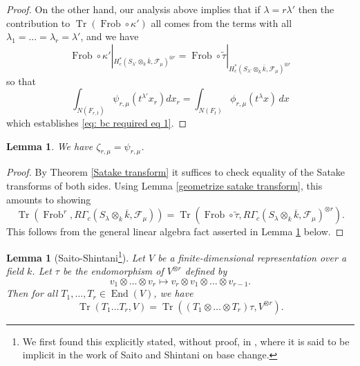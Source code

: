 \documentclass[reqno]{amsart}
\numberwithin{equation}{section}
\newcommand{\wt}[1]{\widetilde{#1}}
\newcommand{\ol}[1]{\overline{#1}}
\newcommand{\Cal}[1]{\mathcal{#1}}
\DeclareMathOperator{\Frob}{Frob}
\DeclareMathOperator{\Tr}{Tr}
\DeclareMathOperator{\End}{End}
\newtheorem{lemma}[thm]{Lemma}
\theoremstyle{remark}
\numberwithin{equation}{section}
\begin{document}
\begin{proof}
On the other hand, our analysis above implies that if $\lambda = r\lambda'$ then the contribution to $\Tr(\Frob \circ \kappa')$ all comes from the terms with all $\lambda_1 = \ldots =  \lambda_r = \lambda'$, and we have 
\[
\Frob \circ \kappa'|_{H_c^*(S_{\lambda'} \otimes_k \ol{k}, \Cal{F}_{\mu})^{\otimes r} }
= \Frob \circ \wt{\tau}|_{H_c^*(S_{\lambda'} \otimes_k \ol{k}, \Cal{F}_{\mu})^{\otimes r}}
\]
so that
\[
\int_{N(F_{r,t})} \psi_{r,\mu}(t^{\lambda'} x_r ) dx_r = \int_{N(F_t)} \phi_{r,\mu}(t^{\lambda} x) \,dx
\]
which establishes \eqref{eq: bc required eq 1}.
\end{proof}

\begin{lemma}\label{lemma2}
We have $\zeta_{r,\mu} = \psi_{r,\mu}$. 
\end{lemma}

\begin{proof} By Theorem \ref{Satake transform} it suffices to check equality of the Satake transforms of both sides. Using Lemma \ref{geometrize satake transform}, this amounts to showing
\[
\Tr(\Frob^r, R \Gamma_c(S_{\lambda} \otimes_k \ol{k}, \Cal{F}_{\mu})) = \Tr(\Frob \circ \wt{\tau}, R\Gamma_c(S_{\lambda} \otimes_k \ol{k}, \Cal{F}_{\mu})^{\otimes r}).
\]
This follows from the general linear algebra fact asserted in Lemma \ref{Saito-Shintani} below.
\end{proof}	

\begin{lemma}[Saito-Shintani\footnote{We first found this explicitly stated, without proof, in \cite{Ngo06}, where it is said to be implicit in the work of Saito and Shintani on base change.}]\label{Saito-Shintani} Let $V$ be a finite-dimensional representation over a field $k$. Let $\tau$ be the endomorphism of $V^{\otimes r}$ defined by 
\[
v_1 \otimes \ldots \otimes v_r \mapsto v_r \otimes v_1 \otimes \ldots \otimes v_{r-1}.
\]
Then for all $T_1, \ldots, T_r \in \End(V)$, we have 
\[
\Tr(T_1 \ldots T_r , V) = \Tr( (T_1 \otimes \ldots \otimes T_r ) \tau , V^{\otimes r}).
\]

\end{lemma}
\end{document}
